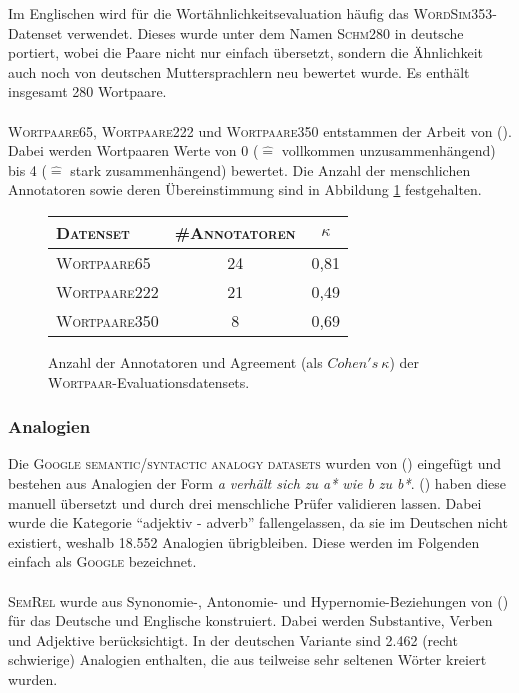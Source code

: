     Im Englischen wird für die Wortähnlichkeitsevaluation häufig das \textsc{WordSim353}-Datenset verwendet. Dieses
    wurde unter dem Namen \textsc{Schm280} in deutsche portiert, wobei die Paare nicht nur einfach übersetzt, sondern die
    Ähnlichkeit auch noch von deutschen Muttersprachlern neu bewertet wurde. Es enthält insgesamt 280 Wortpaare.\\ \\
    \textsc{Wortpaare65}, \textsc{Wortpaare222} und \textsc{Wortpaare350} entstammen der Arbeit von (\cite{rubenstein1965contextual}). Dabei werden Wortpaaren
    Werte von 0 ($\hat{=}$ vollkommen unzusammenhängend) bis 4 ($\hat{=}$ stark zusammenhängend) bewertet. Die Anzahl
    der menschlichen Annotatoren sowie deren Übereinstimmung sind in Abbildung \ref{fig:evalsets} festgehalten.

    \begin{figure}[h]
      \centering
      \begin{tabular}{l|cc}
        \textsc{Datenset} & \textsc{\#Annotatoren} & $\kappa$ \\
        \hline
        \textsc{Wortpaare65} & 24 & 0,81 \\
        \textsc{Wortpaare222} & 21 & 0,49 \\
        \textsc{Wortpaare350} & 8 & 0,69 \\
      \end{tabular}
      \caption{Anzahl der Annotatoren und Agreement (als $Cohen's\ \kappa$) der \textsc{Wortpaar}-Evaluationsdatensets.
      \label{fig:evalsets}}
    \end{figure}

    \subsubsection{Analogien}

    Die \textsc{Google semantic/syntactic analogy datasets} wurden von (\cite{mikolov2013efficient}) eingefügt und bestehen
    aus Analogien der Form \emph{a verhält sich zu a* wie b zu b*}. (\cite{koper2015multilingual}) haben diese manuell übersetzt und durch
    drei menschliche Prüfer validieren lassen. Dabei wurde die Kategorie ``adjektiv - adverb'' fallengelassen, da sie
    im Deutschen nicht existiert, weshalb 18.552 Analogien übrigbleiben. Diese werden im Folgenden einfach als
    \textsc{Google} bezeichnet.\\ \\
    \textsc{SemRel} wurde aus Synonomie-, Antonomie- und Hypernomie-Beziehungen von (\cite{koper2015multilingual}) für das Deutsche und Englische
    konstruiert. Dabei werden Substantive, Verben und Adjektive berücksichtigt. In der deutschen Variante sind 2.462 (recht schwierige) Analogien enthalten,
    die aus teilweise sehr seltenen Wörter kreiert wurden.

